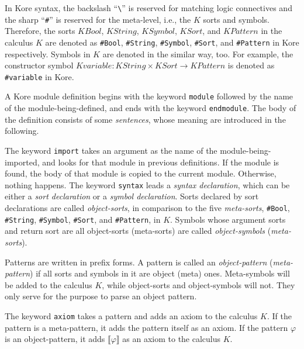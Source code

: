 \documentclass[UTF8]{article}
\theoremstyle{plain}
\theoremstyle{definition}
\theoremstyle{remark}
\newcommand{\Bracket}[1]
    {\llbracket#1\rrbracket}
\newcommand{\KBool}{\mathit{KBool}}
\newcommand{\KString}{\mathit{KString}}
\newcommand{\KSort}{\mathit{KSort}}
\newcommand{\KSymbol}{\mathit{KSymbol}}
\newcommand{\KPattern}{\mathit{KPattern}}
\newcommand{\Kvariable}{\mathit{Kvariable}}
\begin{document}
In Kore syntax, the backslash ``\verb|\|'' is reserved for matching logic connectives and the sharp ``\verb|#|'' is reserved for the meta-level, i.e., the $K$ sorts and symbols. 
Therefore, the sorts $\KBool$, $\KString$, $\KSymbol$, $\KSort$, and 
$\KPattern$ in the calculus $K$ are denoted as \verb|#Bool|, \verb|#String|, 
\verb|#Symbol|, \verb|#Sort|, and \verb|#Pattern| in Kore respectively.
Symbols in $K$ are denoted in the similar way, too. 
For example, the constructor symbol $\Kvariable \colon \KString \times \KSort \to \KPattern$ is denoted as \verb|#variable| in Kore. 

A Kore module definition begins with the keyword \verb|module| followed by the name of the module-being-defined, and ends with the keyword \verb|endmodule|. The body of the definition consists of some \emph{sentences}, whose meaning are introduced in the following.

The keyword \verb|import| takes an argument as the name of the module-being-imported, and looks for that module in previous definitions. 
If the module is found, the body of that module is copied to the current module.
Otherwise, nothing happens. 
The keyword \verb|syntax| leads a \emph{syntax declaration}, which can be either a \emph{sort declaration} or a \emph{symbol declaration}.
Sorts declared by sort declarations are called \emph{object-sorts}, in comparison to the five \emph{meta-sorts}, \verb|#Bool|, \verb|#String|, \verb|#Symbol|, \verb|#Sort|, and \verb|#Pattern|, in $K$. 
Symbols whose argument sorts and return sort are all object-sorts (meta-sorts) are called \emph{object-symbols} (\emph{meta-sorts}).

Patterns are written in prefix forms. 
A pattern is called an \emph{object-pattern} (\emph{meta-pattern}) if all sorts and symbols in it are object (meta) ones.
Meta-symbols will be added to the calculus $K$, while object-sorts and object-symbols will not.
They only serve for the purpose to parse an object pattern. 

The keyword \verb|axiom| takes a pattern and adds an axiom to the calculus $K$.
If the pattern is a meta-pattern, it adds the pattern itself as an axiom.
If the pattern $\varphi$ is an object-pattern, it adds $\Bracket{\varphi}$ as an axiom to the calculus $K$.
\end{document}
